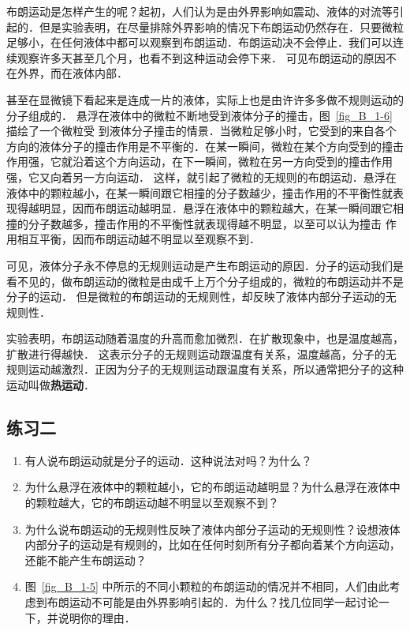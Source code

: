 布朗运动是怎样产生的呢？起初，人们认为是由外界影响如震动、液体的对流等引起的．但是实验表明，在尽量排除外界影响的情况下布朗运动仍然存在．只要微粒足够小，在任何液体中都可以观察到布朗运动．布朗运动决不会停止．我们可以连续观察许多天甚至几个月，也看不到这种运动会停下来．
可见布朗运动的原因不在外界，而在液体内部．

甚至在显微镜下看起来是连成一片的液体，实际上也是由许许多多做不规则运动的分子组成的．
悬浮在液体中的微粒不断地受到液体分子的撞击，图~\ref{fig_B_1-6} 描绘了一个微粒受
到液体分子撞击的情景．当微粒足够小时，它受到的来自各个方向的液体分子的撞击作用是不平衡的．在某一瞬间，微粒在某个方向受到的撞击作用强，它就沿着这个方向运动，在下一瞬间，微粒在另一方向受到的撞击作用强，它又向着另一方向运动．
这样，就引起了微粒的无规则的布朗运动．悬浮在液体中的颗粒越小，在某一瞬间跟它相撞的分子数越少，撞击作用的不平衡性就表现得越明显，因而布朗运动越明显．悬浮在液体中的颗粒越大，在某一瞬间跟它相撞的分子数越多，撞击作用的不平衡性就表现得越不明显，以至可以认为撞击
作用相互平衡，因而布朗运动越不明显以至观察不到．

可见，液体分子永不停息的无规则运动是产生布朗运动的原因．分子的运动我们是看不见的，做布朗运动的微粒是由成千上万个分子组成的，微粒的布朗运动并不是分子的运动．
但是微粒的布朗运动的无规则性，却反映了液体内部分子运动的无规则性．

实验表明，布朗运动随着温度的升高而愈加微烈．在扩散现象中，也是温度越高，扩散进行得越快．
这表示分子的无规则运动跟温度有关系，温度越高，分子的无规则运动越激烈．正因为分子的无规则运动跟温度有关系，所以通常把分子的这种运动叫做\textbf{热运动}．


\subsection*{练习二}
\begin{enumerate}
\item 有人说布朗运动就是分子的运动．这种说法对吗？为什么？
\item 为什么悬浮在液体中的颗粒越小，它的布朗运动越明显？为什么悬浮在液体中的颗粒越大，它的布朗运动越不明显以至观察不到？
\item 为什么说布朗运动的无规则性反映了液体内部分子运动的无规则性？设想液体内部分子的运动是有规则的，比如在任何时刻所有分子都向着某个方向运动，还能不能产生布朗运动？
\item  图~\ref{fig_B_1-5} 中所示的不同小颗粒的布朗运动的情况并不相同，人们由此考虑到布朗运动不可能是由外界影响引起的．为什么？找几位同学一起讨论一下，并说明你的理由．
\end{enumerate}

